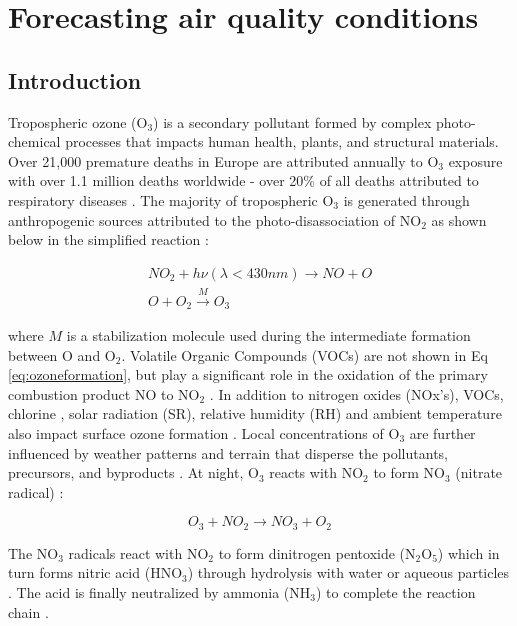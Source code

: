 \chapter{Forecasting air quality conditions}

\section{Introduction}

Tropospheric ozone (O$_{3}$) is a secondary pollutant formed by complex photo-chemical processes that impacts human health, plants, and structural materials. Over 21,000 premature deaths in Europe are attributed annually to O$_{3}$ exposure \citep{WHO2008} with over 1.1 million deaths worldwide - over 20\% of all deaths attributed to respiratory diseases \citep{Malley2017}. The majority of tropospheric O$_{3}$ is generated through anthropogenic sources \citep{Lelieveld2000, Cooper2006} attributed to the photo-disassociation of NO$_{2}$ as shown below in the simplified reaction \citep{Finlayson1993}:

\begin{equation}
\label{eq:ozoneformation}
\begin{gathered}
NO_{2}+h\nu (\lambda < 430nm) \rightarrow NO+O \\
O+O_{2}\overset{M}{\rightarrow} O_{3}
\end{gathered}
\end{equation}

\noindent
where $M$ is a stabilization molecule used during the intermediate formation between O and O$_{2}$. Volatile Organic Compounds (VOCs) are not shown in Eq \ref{eq:ozoneformation}, but play a significant role in the oxidation of the primary combustion product NO to NO$_{2}$ \citep{Song2011}. In addition to nitrogen oxides (NOx's), VOCs, chlorine \citep{Thornton2010}, solar radiation (SR), relative humidity (RH) and ambient temperature also impact surface ozone formation \citep{Sadanaga2003}.  Local concentrations of O$_{3}$ are further influenced by weather patterns and terrain that disperse the pollutants, precursors, and byproducts \citep{Beck1998}. At night, O$_{3}$ reacts with NO$_{2}$ to form NO$_{3}$ (nitrate radical) \citep{Finlayson1993}:

\begin{equation}
\label{eq:nitrateformation}
O_{3} + NO_{2}\rightarrow NO_{3}+O_{2} 
\end{equation}

The NO$_{3}$ radicals react with NO$_{2}$ to form dinitrogen pentoxide (N$_{2}$O$_{5}$) which in turn forms nitric acid (HNO$_{3}$) through hydrolysis with water or aqueous particles \citep{Song2011}. The acid is finally neutralized by ammonia (NH$_{3}$) to complete the reaction chain \citep{Brown2012}.

